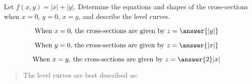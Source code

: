 \documentclass{ximera}
\author{David Guichard \and Neal Koblitz \and H. Jerome Keisler \and Albert Scheller \and Barry Balof \and Mike Wills \and Matthew Carr}
\begin{document}
\begin{exercise}




Let $f(x,y)=|x|+|y|$. Determine the equations and shapes of the cross-sections when $x=0$, $y=0$, $x=y$, and describe the level curves.

\begin{prompt}
\[
\text{When $x=0$, the cross-sections are given by } z=\answer{|y|}
\]
\end{prompt}
\begin{prompt}
\[
\text{When $y=0$, the cross-sections are given by } z=\answer{|x|}
\]
\end{prompt}
\begin{prompt}
\[
\text{When $x=y$, the cross-sections are given by } z=\answer{2}|x|
\]
\end{prompt}

\begin{quote}
The level curves are best described as:
\end{quote}

\begin{multipleChoice}
\end{multipleChoice}

\end{exercise}
\end{document}
